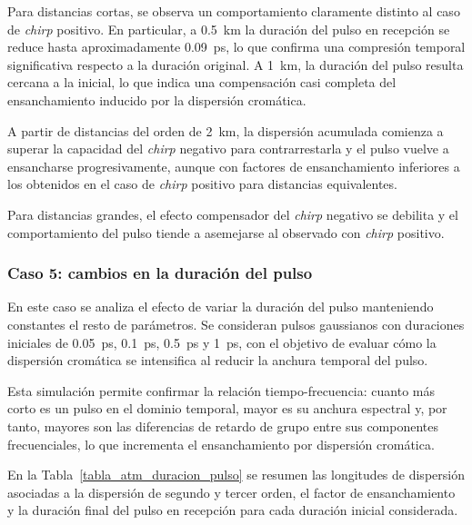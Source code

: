 Para distancias cortas, se observa un comportamiento claramente distinto al caso de \textit{chirp} positivo. En particular, a \SI{0.5}{\kilo\metre} la duración del pulso en recepción se reduce hasta aproximadamente \SI{0.09}{\pico\second}, lo que confirma una compresión temporal significativa respecto a la duración original. A \SI{1}{\kilo\metre}, la duración del pulso resulta cercana a la inicial, lo que indica una compensación casi completa del ensanchamiento inducido por la dispersión cromática.

A partir de distancias del orden de \SI{2}{\kilo\metre}, la dispersión acumulada comienza a superar la capacidad del \textit{chirp} negativo para contrarrestarla y el pulso vuelve a ensancharse progresivamente, aunque con factores de ensanchamiento inferiores a los obtenidos en el caso de \textit{chirp} positivo para distancias equivalentes.

Para distancias grandes, el efecto compensador del \textit{chirp} negativo se debilita y el comportamiento del pulso tiende a asemejarse al observado con \textit{chirp} positivo.


\subsubsection*{Caso 5: cambios en la duración del pulso}

En este caso se analiza el efecto de variar la duración del pulso manteniendo constantes el resto de parámetros. Se consideran pulsos gaussianos con duraciones iniciales de \SI{0.05}{\pico\second}, \SI{0.1}{\pico\second}, \SI{0.5}{\pico\second} y \SI{1}{\pico\second}, con el objetivo de evaluar cómo la dispersión cromática se intensifica al reducir la anchura temporal del pulso.

Esta simulación permite confirmar la relación tiempo-frecuencia: cuanto más corto es un pulso en el dominio temporal, mayor es su anchura espectral y, por tanto, mayores son las diferencias de retardo de grupo entre sus componentes frecuenciales, lo que incrementa el ensanchamiento por dispersión cromática.

En la Tabla~\ref{tabla_atm_duracion_pulso} se resumen las longitudes de dispersión asociadas a la dispersión de segundo y tercer orden, el factor de ensanchamiento y la duración final del pulso en recepción para cada duración inicial considerada.


